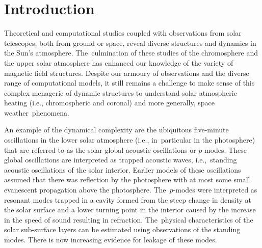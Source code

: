 \documentclass[physics,article,accept,pdftex,moreauthors]{Definitions/mdpi}
\begin{document}

\section{Introduction}

Theoretical and computational studies coupled with observations from solar telescopes,  both from ground or space, reveal diverse structures and dynamics in the Sun's atmosphere. The~culmination of these studies of the  chromosphere and the upper solar atmosphere has enhanced our knowledge of the variety of magnetic field structures.  Despite our armoury of observations and the diverse range of computational models, it still remains a challenge to make sense of this complex menagerie of dynamic structures to understand solar atmospheric heating (i.e., chromospheric and coronal) and more generally, space weather~phenomena.


An example of the dynamical complexity are the ubiquitous five-minute oscillations in the  lower solar atmosphere  (i.e., in~particular in the photosphere) that are referred to as the solar global acoustic oscillations or $p$-modes. These global oscillations are interpreted as trapped acoustic waves, i.e.,~standing acoustic oscillations of the solar interior. Earlier models of these oscillations assumed that there was reflection by the photosphere with at most some small evanescent propagation above the photosphere. The~$p$-modes were interpreted as resonant modes trapped in a cavity formed from the steep change in density at the solar surface and a lower turning point in the interior caused by the increase in the speed of sound resulting in refraction. The~physical characteristics of the solar sub-surface layers can be estimated using observations of the standing modes.  There is now increasing evidence for leakage of these modes. %

   
\end{document}
